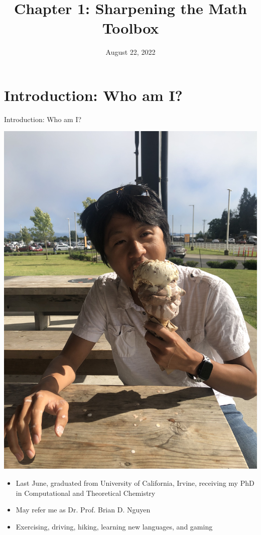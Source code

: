 \documentclass[11pt]{beamer}
\title{Chapter 1: Sharpening the Math Toolbox}
\institute{Chemistry Department, Cypress College}
\date{August 22, 2022}
\begin{document}
\begin{frame}
  \titlepage
\end{frame}

\section{Introduction: Who am I?}

\begin{frame}{Introduction: Who am I?}
  \begin{center}
    \includegraphics[angle=-90,origin=c,scale=0.03]{triple_ice}
  \end{center}
  \begin{itemize}
  \item Last June, graduated from University of California, Irvine,
    receiving my PhD in Computational and Theoretical Chemistry
  \item May refer me as Dr. Prof. Brian D. Nguyen
  \item Exercising, driving, hiking, learning new languages, and gaming
  \end{itemize}
\end{frame}
\end{document}
